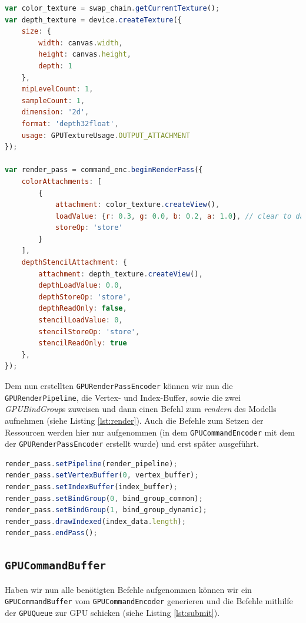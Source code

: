 \documentclass[oneside]{ausarbeitung}
\begin{document}
\begin{minipage}{\textwidth}
\begin{lstlisting}[language=JavaScript, label={lst:render_pass}, caption={Erstellen eines \texttt{GPURenderPassEncoder} vom \texttt{GPUCommandEncoder}. Die benötigte \textit{color texture} bekommen wir von der \texttt{GPUSwapChain} und die benötigte \textit{depth texture} erstellen wir jedes Mal neu.}]
var color_texture = swap_chain.getCurrentTexture();
var depth_texture = device.createTexture({
    size: {
        width: canvas.width,
        height: canvas.height,
        depth: 1
    },
    mipLevelCount: 1,
    sampleCount: 1,
    dimension: '2d',
    format: 'depth32float',
    usage: GPUTextureUsage.OUTPUT_ATTACHMENT
});

var render_pass = command_enc.beginRenderPass({
    colorAttachments: [
        {
            attachment: color_texture.createView(),
            loadValue: {r: 0.3, g: 0.0, b: 0.2, a: 1.0}, // clear to dark purple
            storeOp: 'store'
        }
    ],
    depthStencilAttachment: {
        attachment: depth_texture.createView(),
        depthLoadValue: 0.0,
        depthStoreOp: 'store',
        depthReadOnly: false,
        stencilLoadValue: 0,
        stencilStoreOp: 'store',
        stencilReadOnly: true
    },
});
\end{lstlisting}
\end{minipage}

Dem nun erstellten \texttt{GPURenderPassEncoder} können wir nun die \texttt{GPURenderPipeline}, die Vertex- und Index-Buffer, sowie die zwei \textit{GPUBindGroup}s zuweisen und dann einen Befehl zum \textit{rendern} des Modells aufnehmen (siehe Listing \ref{lst:render}). Auch die Befehle zum Setzen der Ressourcen werden hier nur aufgenommen (in dem \texttt{GPUCommandEncoder} mit dem der \texttt{GPURenderPassEncoder} erstellt wurde) und erst später ausgeführt.

\begin{lstlisting}[language=JavaScript, label={lst:render}, caption={Erstellen einer \texttt{GPUSwapChain} von einem \texttt{HTMLCanvasElement}}]
render_pass.setPipeline(render_pipeline);
render_pass.setVertexBuffer(0, vertex_buffer);
render_pass.setIndexBuffer(index_buffer);
render_pass.setBindGroup(0, bind_group_common);
render_pass.setBindGroup(1, bind_group_dynamic);
render_pass.drawIndexed(index_data.length);
render_pass.endPass();
\end{lstlisting}

\subsection{\texttt{GPUCommandBuffer}}
\label{sub:command_buffer}
Haben wir nun alle benötigten Befehle aufgenommen können wir ein \texttt{GPUCommandBuffer} vom \texttt{GPUCommandEncoder} generieren und die Befehle mithilfe der \texttt{GPUQueue} zur \ac{GPU} schicken (siehe Listing \ref{lst:submit}).
\end{document}
